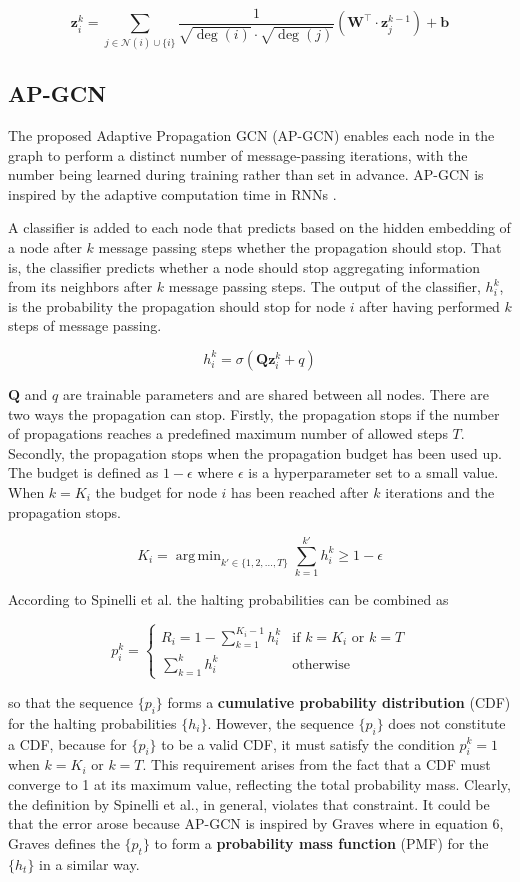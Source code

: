 \documentclass{gdl}
\DeclareMathOperator*{\argmin}{arg\,min}
\begin{document}
$$
\mathbf{z}_i^{k} = \sum_{j \in \mathcal{N}(i) \cup \{i\}} \frac{1}{\sqrt{\deg(i)} \cdot \sqrt{\deg(j)}} \left( \mathbf{W}^\top \cdot \mathbf{z}_j^{k-1} \right) + \mathbf{b}
$$

\subsection{AP-GCN}
The proposed Adaptive Propagation GCN (AP-GCN) enables each node in the graph to perform a distinct number of message-passing iterations, with the number being learned during training rather than set in advance. AP-GCN is inspired by the adaptive computation time in RNNs \cite{graves2017}.

A classifier is added to each node that predicts based on the hidden embedding of a node after $k$ message passing steps whether the propagation should stop. That is, the classifier predicts whether a node should stop aggregating information from its neighbors after $k$ message passing steps. The output of the classifier, $h^k_i$, is the probability the propagation should stop for node $i$ after having performed $k$ steps of message passing.

$$h^k_i = \sigma(\textbf{Q}\textbf{z}^k_i + q)$$

\noindent $\textbf{Q}$ and $q$ are trainable parameters and are shared between all nodes. There are two ways the propagation can stop. Firstly, the propagation stops if the number of propagations reaches a predefined maximum number of allowed steps $T$. Secondly, the propagation stops when the propagation budget has been used up. The budget is defined as $1-\epsilon$ where $\epsilon$ is a hyperparameter set to a small value. When $k=K_i$ the budget for node $i$ has been reached after $k$ iterations and the propagation stops. 

$$ K_i = \argmin_{k' \in \{1, 2, ..., T\}} \sum_{k=1}^{k'} h_i^k \geq 1-\epsilon $$

\noindent According to Spinelli et al. the halting probabilities can be combined as

\[
    p_i^k = 
    \begin{cases}
    R_i = 1 - \sum_{k=1}^{K_i - 1} h_i^k & \text{if } k = K_i \text{ or } k = T \\
    \sum_{k=1}^{k} h_i^k & \text{otherwise}
    \end{cases}
\]

\noindent so that the sequence $\{p_i\}$ forms a \textbf{cumulative probability distribution} (CDF) for the halting probabilities $\{h_i\}$. However, the sequence $\{p_i\}$ does not constitute a CDF, because for $\{p_i\}$ to be a valid CDF, it must satisfy the condition $p_i^k = 1$ when $k = K_i$ or $k = T$. This requirement arises from the fact that a CDF must converge to 1 at its maximum value, reflecting the total probability mass. Clearly, the definition by Spinelli et al., in general, violates that constraint. It could be that the error arose because AP-GCN is inspired by Graves \cite{graves2017} where in equation 6, Graves defines the $\{p_t\}$ to form a \textbf{probability mass function} (PMF) for the $\{h_t\}$ in a similar way.
\end{document}
